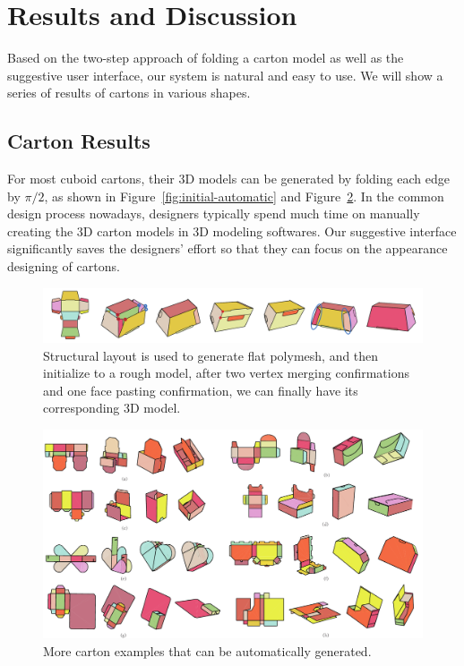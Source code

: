 \section{Results and Discussion}\label{sec:result}


Based on the two-step approach of folding a carton model as well as the suggestive user interface, our system is natural and easy to use. 
%
We will show a series of results of cartons in various shapes. 
%

\subsection{Carton Results}


For most cuboid cartons, their 3D models can be generated by folding each edge by $\pi/2$, as shown in Figure~\ref{fig:initial-automatic} and Figure~\ref{fig:automatic-more}.
In the common design process nowadays, designers typically spend much time on manually creating the 3D carton models in 3D modeling softwares. 
Our suggestive interface significantly saves the designers' effort so that they can focus on the appearance designing of cartons. 

\begin{figure}
	\centering
	\includegraphics[width=\textwidth]{images/105}
	\caption{Structural layout is used to generate flat polymesh, and then initialize to a rough model, after two vertex merging confirmations and one face pasting confirmation, we can finally have its corresponding 3D model.}
	\label{fig:result}
\end{figure}

\begin{figure}
	\centering
	\includegraphics[width=\textwidth]{images/moreAutomatic}
	\caption{More carton examples that can be automatically generated.   }
	\label{fig:automatic-more}
	
\end{figure}

